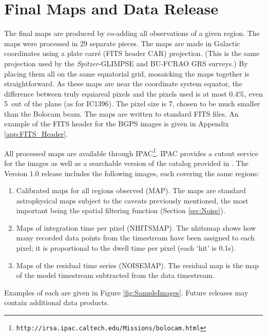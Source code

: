 \documentclass[12pt,preprint]{aastex}
\def\spitzer{{\em Spitzer}}
\begin{document}
\section{Final Maps and Data Release}
\label{sec:FinalMaps}

The final maps are produced by co-adding all observations of a given
region.  The maps were processed in 29 separate pieces.  The maps are
made in Galactic coordinates using a plate carr\'{e} (FITS header CAR)
projection.  (This is the same projection used by the \spitzer-GLIMPSE
and BU-FCRAO GRS surveys.)  By placing them all on the same equatorial
grid, mosaicking the maps together is straightforward.  As these maps
are near the coordinate system equator, the difference between truly
equiareal pixels and the pixels used is at most 0.4\%, even 5\arcdeg\
out of the plane (as for IC1396).  The pixel size is 7, chosen
to be much smaller than the Bolocam beam.  The maps are written to
standard FITS files.  An example of the FITS header for the BGPS
images is given in Appendix \ref{app:FITS_Header}.

All processed maps are available through
IPAC\footnote{\tt http://irsa.ipac.caltech.edu/Missions/bolocam.html}.
IPAC provides a cutout service for the images as well as a searchable
version of the catalog provided in \citet{rosolowsky10}.  The Version
1.0 release includes the following images, each covering the same
regions:

\begin{enumerate}
\item Calibrated maps for all regions observed (MAP).  The maps are
standard astrophysical maps subject to the caveats previously
mentioned, the most important being the spatial filtering function
(Section \ref{sec:Noise}).

\item Maps of integration time per pixel (NHITSMAP).  The nhitsmap
shows how many recorded data points from the timestream have been
assigned to each pixel; it is proportional to the dwell time per pixel
(each `hit' is 0.1s).

\item Maps of the residual time series (NOISEMAP).  The residual map
is the map of the model timestream subtracted from the data
timestream.

\end{enumerate}

Examples of each are given in Figure \ref{fig:SampleImages}.  Future
releases may contain additional data products.
\end{document}
